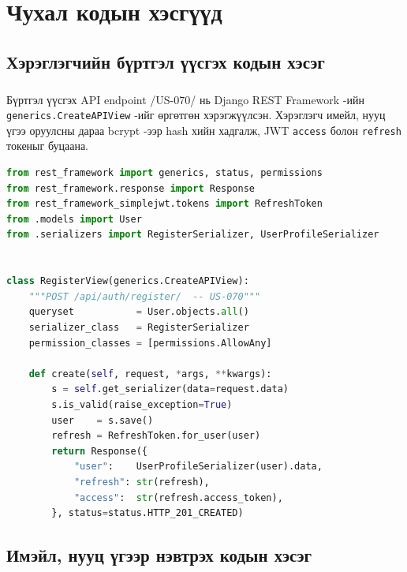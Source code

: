 \label{AppendixA} %
\chapter*{Чухал кодын хэсгүүд}

\section*{Хэрэглэгчийн бүртгэл үүсгэх кодын хэсэг}
\paragraph{} Бүртгэл үүсгэх API endpoint /US-070/ нь Django REST Framework -ийн \texttt{generics.CreateAPIView} -ийг өргөтгөн хэрэгжүүлсэн. Хэрэглэгч имейл, нууц үгээ оруулсны дараа bcrypt -ээр hash хийн хадгалж, JWT \texttt{access} болон \texttt{refresh} токеныг буцаана.
\begin{lstlisting}[language=Python]
from rest_framework import generics, status, permissions
from rest_framework.response import Response
from rest_framework_simplejwt.tokens import RefreshToken
from .models import User
from .serializers import RegisterSerializer, UserProfileSerializer


class RegisterView(generics.CreateAPIView):
    """POST /api/auth/register/  -- US-070"""
    queryset           = User.objects.all()
    serializer_class   = RegisterSerializer
    permission_classes = [permissions.AllowAny]

    def create(self, request, *args, **kwargs):
        s = self.get_serializer(data=request.data)
        s.is_valid(raise_exception=True)
        user    = s.save()
        refresh = RefreshToken.for_user(user)
        return Response({
            "user":    UserProfileSerializer(user).data,
            "refresh": str(refresh),
            "access":  str(refresh.access_token),
        }, status=status.HTTP_201_CREATED)
\end{lstlisting}

\section*{Имэйл, нууц үгээр нэвтрэх кодын хэсэг}
